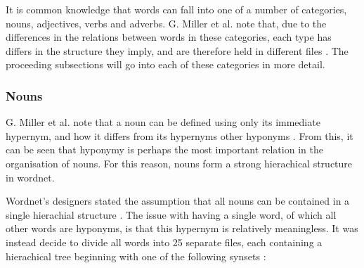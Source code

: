 \documentclass[]{article}
\begin{document}
It is common knowledge that words can fall into one of a number of categories, nouns, adjectives, verbs and adverbs. G. Miller et al. note that, due to the differences in the relations between words in these categories, each type has differs in the structure they imply, and are therefore held in different files \cite{WN1Introduction}. The proceeding subsections will go into each of these categories in more detail.

\subsubsection{Nouns}
\label{Nouns}
G. Miller et al. note that a noun can be defined using only its immediate hypernym, and how it differs from its hypernyms other hyponyms \cite{WN2Nouns}. From this, it can be seen that hyponymy is perhaps the most important relation in the organisation of nouns. For this reason, nouns form a strong hierachical structure in wordnet.

Wordnet's designers stated the assumption that all nouns can be contained in a single hierachial structure \cite{WN2Nouns}. The issue with having a single word, of which all other words are hyponyms, is that this hypernym is relatively meaningless. It was instead decide to divide all words into 25 separate files, each containing a hierachical tree beginning with one of the following synsets \cite{WN2Nouns}:
\end{document}
